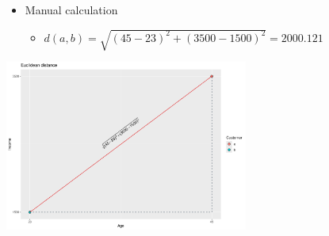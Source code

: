 \documentclass[
  ignorenonframetext,
]{beamer}
\providecommand{\tightlist}{%
  \setlength{\itemsep}{0pt}\setlength{\parskip}{0pt}}\usepackage{longtable,booktabs,array}
\begin{document}
\begin{frame}{}
\label{section-10}
\begin{itemize}
\item
  Manual calculation

  \begin{itemize}
  \tightlist
  \item
    \(d(a,b) = \sqrt{(45 - 23)^2 + (3500 - 1500)^2} = 2000.121\)
  \end{itemize}
\end{itemize}

\begin{center}
\includegraphics[width=0.6\textwidth,height=\textheight]{011_segmentation_clustering_files/figure-beamer/unnamed-chunk-6-1.pdf}
\end{center}
\end{frame}
\end{document}
